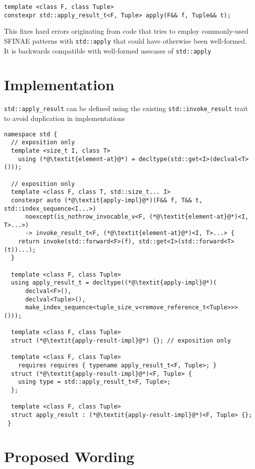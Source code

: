 \documentclass{article}
\begin{document}
\begin{lstlisting}
template <class F, class Tuple>
constexpr std::apply_result_t<F, Tuple> apply(F&& f, Tuple&& t);
\end{lstlisting}

This fixes hard errors originating from code that tries to employ commonly-used
SFINAE patterns with \texttt{std::apply} that could have otherwise been
well-formed. It is backwards compatible with well-formed usecases of
\texttt{std::apply}

\section{Implementation}
\texttt{std::apply\_result} can be defined using the existing
\texttt{std::invoke\_result} trait to avoid duplication in implementations

\begin{lstlisting}
namespace std {
  // exposition only
  template <size_t I, class T>
    using (*@\textit{element-at}@*) = decltype(std::get<I>(declval<T>()));

  // exposition only
  template <class F, class T, std::size_t... I>
  constexpr auto (*@\textit{apply-impl}@*)(F&& f, T&& t, std::index_sequence<I...>)
      noexcept(is_nothrow_invocable_v<F, (*@\textit{element-at}@*)<I, T>...>)
      -> invoke_result_t<F, (*@\textit{element-at}@*)<I, T>...> {
    return invoke(std::forward<F>(f), std::get<I>(std::forward<T>(t))...);
  }

  template <class F, class Tuple>
  using apply_result_t = decltype((*@\textit{apply-impl}@*)(
      declval<F>(),
      declval<Tuple>(),
      make_index_sequence<tuple_size_v<remove_reference_t<Tuple>>>()));

  template <class F, class Tuple>
  struct (*@\textit{apply-result-impl}@*) {}; // exposition only

  template <class F, class Tuple>
    requires requires { typename apply_result_t<F, Tuple>; }
  struct (*@\textit{apply-result-impl}@*)<F, Tuple> {
    using type = std::apply_result_t<F, Tuple>;
  };

  template <class F, class Tuple>
  struct apply_result : (*@\textit{apply-result-impl}@*)<F, Tuple> {};
 }
\end{lstlisting}

\section{Proposed Wording}
\end{document}
